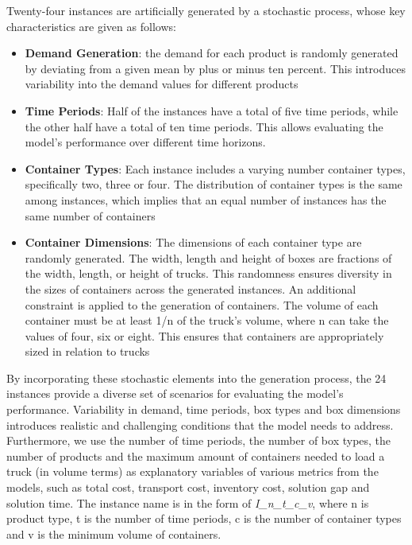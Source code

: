 Twenty-four instances are artificially generated by a stochastic process, whose key characteristics are given as follows:

\begin{itemize}
  \item \textbf{Demand Generation}: the demand for each product is randomly generated by deviating from a given mean by plus or minus ten percent. This introduces variability into the demand values for different products

  \item \textbf{Time Periods}: Half of the instances have a total of five time periods, while the other half have a total of ten time periods. This allows evaluating the model's performance over different time horizons.

  \item \textbf{Container Types}: Each instance includes a varying number container types, specifically two, three or four. The distribution of container types is the same among instances, which implies that an equal number of instances has the same number of containers

  \item \textbf{Container Dimensions}: The dimensions of each container type are randomly generated. The width, length and height of boxes are fractions of the width, length, or height of trucks. This randomness ensures diversity in the sizes of containers across the generated instances. An additional constraint is applied to the generation of containers. The volume of each container must be at least 1/n of the truck’s volume, where n can take the values of four, six or eight. This ensures that containers are appropriately sized in relation to trucks

\end{itemize}
By incorporating these stochastic elements into the generation process, the 24 instances provide a diverse set of scenarios for evaluating the model’s performance. Variability in demand, time periods, box types and box dimensions introduces realistic and challenging conditions that the model needs to address. Furthermore, we use the number of time periods, the number of box types, the number of products and the maximum amount of containers needed to load a truck (in volume terms) as explanatory variables of various metrics from the models, such as total cost, transport cost, inventory cost, solution gap and solution time. The instance name is in the form of \textit{I\_n\_t\_c\_v}, where n is product type, t is the number of time periods, c is the number of container types and v is the minimum volume of containers.

